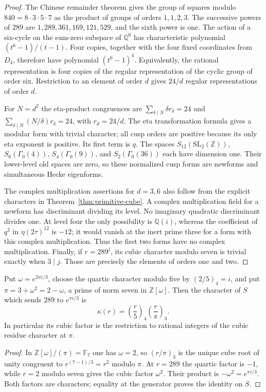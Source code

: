 \begin{proof}
The Chinese remainder theorem gives the group of squares modulo
$840=8\cdot3\cdot5\cdot7$ as the product of groups of orders
$1,1,2,3$. The successive powers of $289$ are
$1,289,361,169,121,529$, and the sixth power is one. The action of a
six-cycle on the sum-zero subspace of $\mathbb Q^6$ has characteristic
polynomial $(t^6-1)/(t-1)$. Four copies, together with the four fixed
coordinates from $D_4$, therefore have polynomial $(t^6-1)^4$.
Equivalently, the rational representation is four copies of the regular
representation of the cyclic group of order six. Restriction to an
element of order $d$ gives $24/d$ regular representations of order $d$.

For $N=d^2$ the eta-product congruences are
$\sum_{\delta\mid N}\delta r_\delta=24$ and
$\sum_{\delta\mid N}(N/\delta)r_\delta=24$, with $r_d=24/d$.
The eta transformation formula gives a modular form with trivial
character; all cusp orders are positive because its only eta exponent
is positive. Its first term is $q$. The spaces
$S_{12}(\mathrm{SL}_2(\mathbb Z))$, $S_6(\Gamma_0(4))$,
$S_4(\Gamma_0(9))$, and $S_2(\Gamma_0(36))$ each have dimension one.
Their lower-level old spaces are zero, so these normalized cusp forms
are newforms and simultaneous Hecke eigenforms.

The complex multiplication assertions for $d=3,6$ also follow from the
explicit characters in Theorem~\ref{thm:primitive-cube}.
A complex multiplication field for a newform has discriminant dividing
its level. No imaginary quadratic discriminant divides one. At level
four the only possibility is $\mathbb Q(i)$, whereas the coefficient
of $q^3$ in $\eta(2\tau)^{12}$ is $-12$; it would vanish at the inert
prime three for a form with this complex multiplication. Thus the first
two forms have no complex multiplication. Finally, if $r=289^j$, its
cubic character modulo seven is trivial exactly when $3\mid j$.
Those are precisely the elements of orders one and two.
\end{proof}

\begin{proposition}\label{prop:residue-symbol}
Put $\omega=e^{2\pi i/3}$, choose the quartic character modulo five
by $(2/5)_4=i$, and put
$\pi=3+\omega^2=2-\omega$, a prime of norm seven in $\mathbb Z[\omega]$.
Then the character of $S$ which sends $289$ to $e^{\pi i/3}$ is
\[
 \kappa(r)=\left(\frac r5\right)_4
                \left(\frac r\pi\right)_3 .
\]
In particular its cubic factor is the restriction to rational integers
of the cubic residue character at $\pi$.
\end{proposition}
\begin{proof}
In $\mathbb Z[\omega]/(\pi)=\mathbb F_7$ one has $\omega=2$,
so $(r/\pi)_3$ is the unique cube root of unity congruent to
$r^{(7-1)/3}=r^2$ modulo $\pi$. At $r=289$ the quartic factor is
$-1$, while $r=2$ modulo seven gives the cubic factor $\omega^2$.
Their product is $-\omega^2=e^{\pi i/3}$. Both factors are
characters; equality at the generator proves the identity on $S$.
\end{proof}

